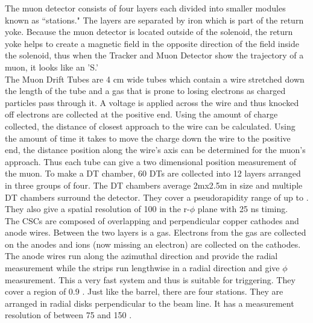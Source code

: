 	The muon detector consists of four layers each divided into smaller modules known as ``stations." The layers are separated by iron which is part of the return yoke. Because the muon detector is located outside of the solenoid, the return yoke helps to create a magnetic field in the opposite direction of the field inside the solenoid, thus when the Tracker and Muon Detector show the trajectory of a muon, it looks like an 'S.'\\
	
	The Muon Drift Tubes are 4 cm wide tubes which contain a wire stretched down the length of the tube and a gas that is prone to losing electrons as charged particles pass through it. A voltage is applied across the wire and thus knocked off electrons are collected at the positive end. Using the amount of charge collected, the distance of closest approach to the wire can be calculated. Using the amount of time it takes to move the charge down the wire to the positive end, the distance position along the wire's axis can be determined for the muon's approach. Thus each tube can give a two dimensional position measurement of the muon. To make a DT chamber, 60 DTs are collected into 12 layers arranged in three groups of four. The DT chambers average 2mx2.5m in size and multiple DT chambers surround the detector. They cover a pseudorapidity range of up to \abseta {}. They also give a spatial resolution of 100 \um in the r-$\phi$ plane with 25 ns timing.\\
	
	The CSCs are composed of overlapping and perpendicular copper cathodes and anode wires. Between the two layers is a gas. Electrons from the gas are collected on the anodes and ions (now missing an electron) are collected on the cathodes. The anode wires run along the azimuthal direction and provide the radial measurement while the strips run lengthwise in a radial direction and give  $\phi$ measurement. This a very fast system and thus is suitable for triggering. They cover a region of 0.9 \lt \abseta {}. Just like the barrel, there are four stations. They are arranged in radial disks perpendicular to the beam line. It has a measurement resolution of between 75 and 150 \um.
	
